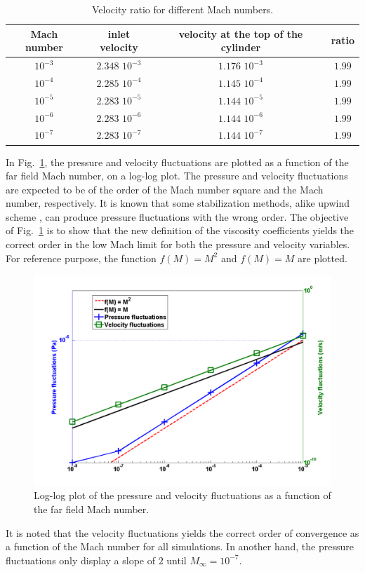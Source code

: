 \documentclass[preprint,10pt]{elsarticle}
\newcommand{\fig}[1]{Fig.~\ref{#1}}                      %
\begin{document}
\begin{table}[H]
\begin{center}
 \caption{\label{tbl:velocity_ratio}Velocity ratio for different Mach numbers.}
\begin{tabular}{|c|c|c|c|}
\hline
Mach number & inlet velocity & velocity at the top of the cylinder & ratio \\ \hline
$10^{-3}$ & $2.348$ $10^{-3}$ & $1.176$ $10^{-3}$& $1.99$ \\ \hline
$10^{-4}$ & $2.285$ $10^{-4}$ & $1.145$ $10^{-4}$& $1.99$ \\ \hline
$10^{-5}$ & $2.283$ $10^{-5}$ & $1.144$ $10^{-5}$ & $1.99$ \\ \hline
$10^{-6}$ & $2.283$ $10^{-6}$ & $1.144$ $10^{-6}$ & $1.99$ \\ \hline
$10^{-7}$ & $2.283$ $10^{-7}$ & $1.144$ $10^{-7}$ & $1.99$ \\ \hline
\end{tabular}
\end{center}
\nonumber
\end{table}
In \fig{fig:pressure_vel_fluc}, the pressure and velocity fluctuations are plotted as a function of the far field Mach number, on a log-log plot. The pressure and velocity fluctuations are expected to be of the order of the Mach number square and the Mach number, respectively. It is known that some stabilization methods, alike upwind scheme \cite{guillard}, can produce pressure fluctuations with the wrong order. The objective of \fig{fig:pressure_vel_fluc} is to show that the new definition of the viscosity coefficients yields the correct order in the low Mach limit for both the pressure and velocity variables. For reference purpose, the function $f(M) = M^2$ and $f(M)=M$ are plotted.  
\begin{figure}[H]
\centering
\includegraphics[width=\textwidth]{pressure_fluctuation.png}
\caption{Log-log plot of the pressure and velocity fluctuations as a function of the far field Mach number.}
\label{fig:pressure_vel_fluc}
\end{figure}
It is noted that the velocity fluctuations yields the correct order of convergence as a function of the Mach number for all simulations. In another hand, the pressure fluctuations only display a slope of $2$ until $M_{\infty} = 10^{-7}$.
\end{document}
